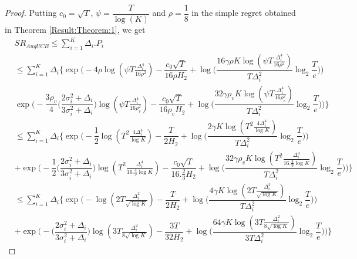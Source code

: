 \begin{proof}
Putting $c_{0}=\sqrt{T}$, $\psi=\dfrac{T}{\log (K)}$ and $\rho=\dfrac{1}{8}$ in the simple regret obtained in Theorem \ref{Result:Theorem:1}, we get
\begin{align*}
& SR_{AugUCB} \leq \sum_{i=1}^{K} \Delta_{i}. P_{i}\\
& \leq \sum_{i=1}^{K} \Delta_{i}\bigg\lbrace \exp\bigg(-4\rho\log (\psi T\frac{\Delta_{i}^{4}}{16\rho^{2}})-\dfrac{c_{0}\sqrt{T}}{16\rho H_{2}} + \log \big( \dfrac{16\gamma\rho K\log (\psi T \frac{\Delta_{i}^{4}}{16\rho^{2}})}{T\Delta_{i}^{2}}\log_{2}\dfrac{T}{e} \big) \bigg) \\
& \exp\bigg(- \dfrac{3\rho_v}{4} \bigg(\dfrac{2\sigma_{i}^{2}+\Delta_{i}}{3\sigma_{i}^{2}+\Delta_{i}}\bigg)\log(\psi T\frac{\Delta_{i}^{4}}{16\rho_{v}^{2}}) -\dfrac{c_{0}\sqrt{T}}{16\rho_v H_{2}} + \log\big ( \dfrac{32\gamma\rho_v K\log (\psi T \frac{\Delta_{i}^{4}}{16\rho_{v}^{2}})}{T\Delta_{i}^{2}}\log_{2}\dfrac{T}{e} \big)  \bigg)\bigg\rbrace\\
&\leq \sum_{i=1}^{K} \Delta_{i}\bigg\lbrace\exp\bigg(-\dfrac{1}{2}\log ( T^{2}\frac{4\Delta_{i}^{4}}{\log K})-\dfrac{T}{2 H_{2}} + \log \big( \dfrac{2\gamma K\log ( T^{2} \frac{4\Delta_{i}^{4}}{\log K})}{T\Delta_{i}^{2}}\log_{2}\dfrac{T}{e} \big) \bigg)\\
& + \exp\bigg(- \dfrac{1}{2} \bigg(\dfrac{2\sigma_{i}^{2}+\Delta_{i}}{3\sigma_{i}^{2}+\Delta_{i}}\bigg)\log( T^{2}\frac{\Delta_{i}^{4}}{16.\frac{4}{9}\log K}) -\dfrac{c_{0}\sqrt{T}}{16.\frac{2}{3} H_{2}} + \log\big ( \dfrac{32\gamma\rho_v K\log ( T^{2} \frac{\Delta_{i}^{4}}{16.\frac{4}{9}\log K})}{T\Delta_{i}^{2}}\log_{2}\dfrac{T}{e} \big)  \bigg)\bigg\rbrace\\
&\leq \sum_{i=1}^{K} \Delta_{i}\bigg\lbrace\exp\bigg(-\log ( 2T\frac{\Delta_{i}^{2}}{\sqrt{\log K}})-\dfrac{T}{2 H_{2}} + \log \big( \dfrac{4\gamma K\log ( 2T \frac{\Delta_{i}^{2}}{\sqrt{\log K}})}{T\Delta_{i}^{2}}\log_{2}\dfrac{T}{e} \big) \bigg)\\
& +  \exp\bigg(- \bigg(\dfrac{2\sigma_{i}^{2}+\Delta_{i}}{3\sigma_{i}^{2}+\Delta_{i}}\bigg)\log( 3T\frac{\Delta_{i}^{2}}{8\sqrt{\log K}}) -\dfrac{3T}{32 H_{2}} + \log\big ( \dfrac{64\gamma K\log ( 3T \frac{\Delta_{i}^{2}}{8\sqrt{\log K}})}{3T\Delta_{i}^{2}}\log_{2}\dfrac{T}{e} \big)  \bigg)\bigg\rbrace
\end{align*} 

\end{proof}